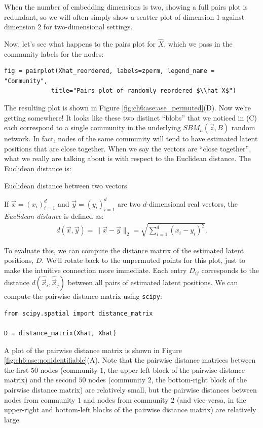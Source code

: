 When the number of embedding dimensions is two, showing a full pairs plot is redundant, so we will often simply show a scatter plot of dimension $1$ against dimension $2$ for two-dimensional settings.

Now, let's see what happens to the pairs plot for $\hat X$, which we pass in the community labels for the nodes:

\begin{lstlisting}[style=python]
fig = pairplot(Xhat_reordered, labels=zperm, legend_name = "Community",
             title="Pairs plot of randomly reordered $\\hat X$")
\end{lstlisting}

The resulting plot is shown in Figure \ref{fig:ch6:ase:ase_permuted}(D). Now we're getting somewhere! It looks like these two distinct ``blobs'' that we noticed in (C) each correspond to a single community in the underlying $SBM_n(\vec z, B)$ random network. In fact, nodes of the same community will tend to have estimated latent positions that are close together. When we say the vectors are ``close together'', what we really are talking about is with respect to the Euclidean distance. The Euclidean distance is:

\begin{floatingbox}[h]\caption{Euclidean distance between two vectors}
\label{def:ch6:se:eucl_dist}

If $\vec x = (x_i)_{i = 1}^d$ and $\vec y = (y_i)_{i = 1}^d$ are two $d$-dimensional real vectors, the \textit{Euclidean distance} is defined as:
\begin{align*}
    d(\vec x, \vec y) = \|\vec x - \vec y\|_2 = \sqrt{\sum_{i = 1}^d (x_i - y_i)^2}.
\end{align*}
\end{floatingbox}
To evaluate this, we can compute the distance matrix of the estimated latent positions, $D$. We'll rotate back to the unpermuted points for this plot, just to make the intuitive connection more immediate. Each entry $D_{ij}$ corresponds to the distance $d(\hat{\vec x}_i, \hat{\vec x}_j)$ between all pairs of estimated latent positions. We can compute the pairwise distance matrix using \texttt{scipy}:

\begin{lstlisting}[style=python]
from scipy.spatial import distance_matrix

D = distance_matrix(Xhat, Xhat)
\end{lstlisting}
A plot of the pairwise distance matrix is shown in Figure \ref{fig:ch6:ase:nonidentifiable}(A). Note that the pairwise distance matrices between the first $50$ nodes (community $1$, the upper-left block of the pairwise distance matrix) and the second $50$ nodes (community $2$, the bottom-right block of the pairwise distance matrix) are relatively small, but the pairwise distances between nodes from community $1$ and nodes from community $2$ (and vice-versa, in the upper-right and bottom-left blocks of the pairwise distance matrix) are relatively large.

